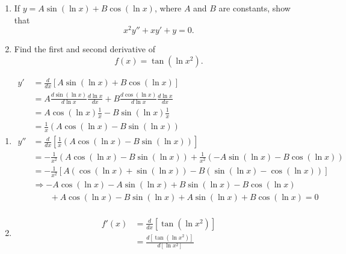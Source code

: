 \documentclass[10pt,letterpaper]{hwset}
\begin{document}
\begin{problem}[2.]
	\begin{enumerate}
		\item If $y=A \sin(\ln x) + B\cos(\ln x)$, where $A$ and $B$ are constants,
			show that 
			\begin{equation*}
				x^2y''+xy'+y=0.
			\end{equation*}
		\item Find the first and second derivative of 
			\begin{equation*}
				f(x) = \tan (\ln x^2).
			\end{equation*}
	\end{enumerate}
\end{problem}

\begin{enumerate}
	\item \begin{solution}
			\begin{align*}
				y' &= \frac{d}{dx}\left[ A\sin(\ln x) + B\cos(\ln x) \right] \\ 
				&= A\frac{d\sin(\ln x)}{d\ln x}\frac{d\ln x}{dx} +
					B\frac{d\cos(\ln x)}{d\ln x}\frac{d\ln x}{dx} \\ 
				&= A\cos(\ln x)\frac{1}{x} - B\sin(\ln x)\frac{1}{x} \\ 
				&= \frac{1}{x}\left( A\cos(\ln x) - B\sin(\ln x)\right) \\ 
				y'' &= \frac{d}{dx}\left[ \frac{1}{x}\left( A\cos(\ln x) - B\sin(\ln x)
					\right)\right] \\
					&= -\frac{1}{x^2}\left( A\cos(\ln x) - B\sin(\ln x)\right) +
						\frac{1}{x^2}\left( -A\sin(\ln x) - B\cos(\ln x) \right) \\
					&= -\frac{1}{x^2}\left[ A\left(\cos(\ln x) + \sin(\ln x)\right) -
						B\left(\sin(\ln x) - \cos(\ln x) \right)\right] \\
					&\Rightarrow -A\cos(\ln x) - A\sin(\ln x) + B\sin(\ln	x) - B\cos(\ln x) \\ 
						&\qquad+ A\cos(\ln x) - B\sin(\ln x) + A\sin(\ln x) + B\cos(\ln x) =
						0 \\ 
			\end{align*}
		\end{solution}
	\item \begin{solution}
			\begin{align*}
				f'(x) &= \frac{d}{dx}\left[ \tan(\ln x^2) \right]\\
				&= \frac{d\left[ \tan(\ln x^2) \right]}{d\left[ \ln x^2 \right]}

\end{align*}
\end{solution}
\end{enumerate}
\end{document}
